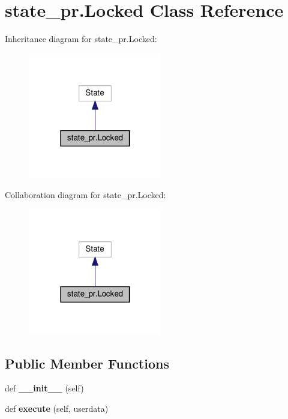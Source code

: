 \hypertarget{classstate__pr_1_1Locked}{}\section{state\+\_\+pr.\+Locked Class Reference}
\label{classstate__pr_1_1Locked}


Inheritance diagram for state\+\_\+pr.\+Locked\+:
\nopagebreak
\begin{figure}[H]
\begin{center}
\leavevmode
\includegraphics[width=166pt]{classstate__pr_1_1Locked__inherit__graph}
\end{center}
\end{figure}


Collaboration diagram for state\+\_\+pr.\+Locked\+:
\nopagebreak
\begin{figure}[H]
\begin{center}
\leavevmode
\includegraphics[width=166pt]{classstate__pr_1_1Locked__coll__graph}
\end{center}
\end{figure}
\subsection*{Public Member Functions}
\begin{DoxyCompactItemize}
\item 
\mbox{\label{classstate__pr_1_1Locked_a256dacf0c1f8c108ceb9521646a73f34}} 
def {\bfseries \+\_\+\+\_\+init\+\_\+\+\_\+} (self)
\item 
\mbox{\label{classstate__pr_1_1Locked_ac07199493d0bb9c39b6ba29b1dc81776}} 
def {\bfseries execute} (self, userdata)
\end{DoxyCompactItemize}
